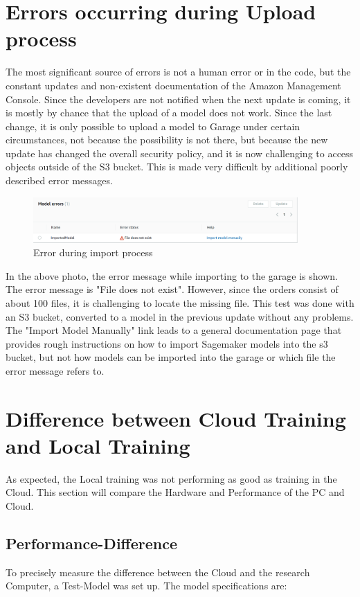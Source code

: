 \section{Errors occurring during Upload process}
The most significant source of errors is not a human error or in the code, but the constant updates and non-existent documentation of the Amazon Management Console. Since the developers are not notified when the next update is coming, it is mostly by chance that the upload of a model does not work. Since the last change, it is only possible to upload a model to Garage under certain circumstances, not because the possibility is not there, but because the new update has changed the overall security policy, and it is now challenging to access objects outside of the S3 bucket. This is made very difficult by additional poorly described error messages.
\begin{figure}[H]
    \centering
    \includegraphics[width=0.9\textwidth]{images/ErrorDuringUpload.PNG}
    \caption[]{Error during import process\footnotemark}
    \label{fig:console-output-start}
\end{figure}
In the above photo, the error message while importing to the garage is shown. The error message is "File does not exist". However, since the orders consist of about 100 files, it is challenging to locate the missing file. This test was done with an S3 bucket, converted to a model in the previous update without any problems. The "Import Model Manually" link leads to a general documentation page that provides rough instructions on how to import Sagemaker models into the s3 bucket, but not how models can be imported into the garage or which file the error message refers to.


\section{Difference between Cloud Training and Local Training}
As expected, the Local training was not performing as good as training in the Cloud. This section will compare the Hardware and Performance of the PC and Cloud. 


\subsection{Performance-Difference}
To precisely measure the difference between the Cloud and the research Computer, a Test-Model was set up. The model specifications are: 
 
